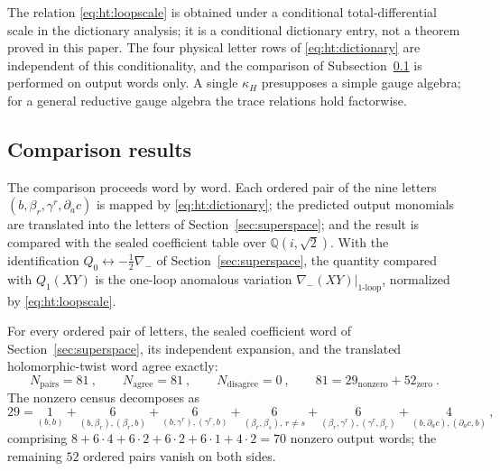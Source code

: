 \begin{remark}\label{rem:ht:conditional}
The relation \eqref{eq:ht:loopscale} is obtained under a conditional
total-differential scale in the dictionary analysis; it is a conditional
dictionary entry, not a theorem proved in this paper. The four physical
letter rows of \eqref{eq:ht:dictionary} are independent of this
conditionality, and the comparison of Subsection~\ref{subsec:ht:results} is
performed on output words only. A single $\kappa_{H}$ presupposes a simple
gauge algebra; for a general reductive gauge algebra the trace relations hold
factorwise.
\end{remark}

\subsection{Comparison results}\label{subsec:ht:results}

The comparison proceeds word by word. Each ordered pair of the nine letters
$(b,\beta_{r},\gamma^{r},\partial_{\dot a}c)$ is mapped by
\eqref{eq:ht:dictionary}; the predicted output monomials are translated into
the letters of Section~\ref{sec:superspace}; and the result is compared with
the sealed coefficient table over $\mathbb Q(i,\sqrt2)$. With the
identification $Q_{0}\leftrightarrow-\tfrac12\nabla_{-}$ of
Section~\ref{sec:superspace}, the quantity compared with $Q_{1}(XY)$ is the
one-loop anomalous variation $\nabla_{-}(XY)|_{\text{1-loop}}$, normalized by
\eqref{eq:ht:loopscale}.

\begin{proposition}\label{thm:ht:81}
For every ordered pair of letters, the sealed coefficient word of
Section~\ref{sec:superspace}, its independent expansion, and the translated
holomorphic-twist word agree exactly:
\begin{equation}\label{eq:ht:81}
N_{\mathrm{pairs}}=81 \ ,\qquad
N_{\mathrm{agree}}=81 \ ,\qquad
N_{\mathrm{disagree}}=0 \ ,\qquad
81=29_{\mathrm{nonzero}}+52_{\mathrm{zero}} \ .
\end{equation}
The nonzero census decomposes as
\begin{equation}\label{eq:ht:29}
29=\underset{(b,b)}{1}
+\underset{(b,\beta_{r}),(\beta_{r},b)}{6}
+\underset{(b,\gamma^{r}),(\gamma^{r},b)}{6}
+\underset{(\beta_{r},\beta_{s}),\,r\neq s}{6}
+\underset{(\beta_{r},\gamma^{r}),(\gamma^{r},\beta_{r})}{6}
+\underset{(b,\partial_{\dot a}c),(\partial_{\dot a}c,b)}{4} \ ,
\end{equation}
comprising $8+6\cdot4+6\cdot2+6\cdot2+6\cdot1+4\cdot2=70$ nonzero output
words; the remaining $52$ ordered pairs vanish on both sides.
\end{proposition}

